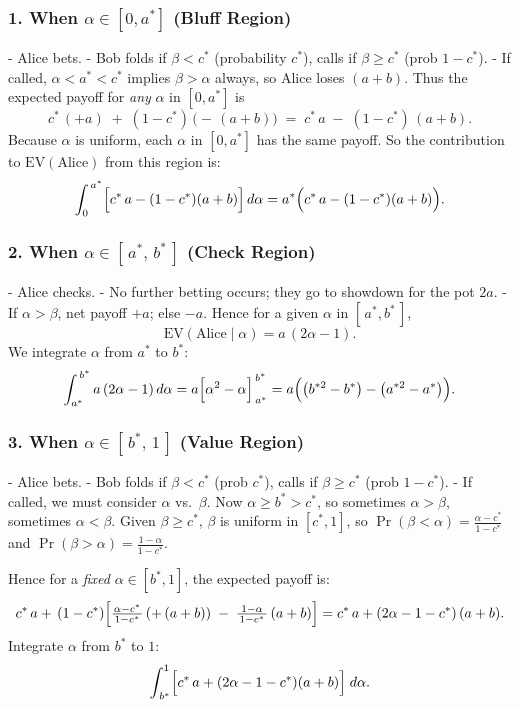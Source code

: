 \documentclass{article}
\begin{document}
\subsubsection*{1. When \texorpdfstring{$\alpha \in [0,a^*]$}{alpha in [0,a*]} (Bluff Region)}

- Alice bets.  
- Bob folds if $\beta < c^*$ (probability $c^*$), calls if $\beta \ge c^*$ (prob $1-c^*$).  
- If called, $\alpha < a^* < c^*$ implies $\beta > \alpha$ always, so Alice loses $(a+b)$.  
Thus the expected payoff for \emph{any} $\alpha$ in $[0,a^*]$ is
\[
c^*\,(+a)\;+\;(1-c^*)\,\bigl(-\,(a+b)\bigr)
\;=\;
c^*\,a \;-\;(1-c^*)\,(a+b).
\]
Because $\alpha$ is uniform, each $\alpha$ in $[0,a^*]$ has the same payoff.  So the contribution to $\mathrm{EV}(\text{Alice})$ from this region is:
\[
\int_0^{\,a^*} \Bigl[c^*\,a -(1-c^*)(a+b)\Bigr]\,d\alpha
= a^*\Bigl(c^*\,a -(1-c^*)(a+b)\Bigr).
\]

\subsubsection*{2. When \texorpdfstring{$\alpha \in [\,a^*,\,b^*\,]$}{alpha in [a*, b*]} (Check Region)}

- Alice checks.  
- No further betting occurs; they go to showdown for the pot $2a$.  
- If $\alpha > \beta$, net payoff $+a$; else $-a$.  
Hence for a given $\alpha$ in $[\,a^*,b^*\,]$, 
\[
\text{EV}(\text{Alice}\mid \alpha) = a\,(2\alpha -1).
\]
We integrate $\alpha$ from $a^*$ to $b^*$:
\[
\int_{a^*}^{\,b^*} a\,(2\alpha -1)\,d\alpha 
= a\Bigl[\alpha^2 - \alpha\Bigr]_{\,a^*}^{\,b^*}
= a\Bigl(\bigl(b^{*2}-b^*\bigr) - \bigl(a^{*2}-a^*\bigr)\Bigr).
\]

\subsubsection*{3. When \texorpdfstring{$\alpha \in [\,b^*,\,1\,]$}{alpha in [b*,1]} (Value Region)}

- Alice bets.  
- Bob folds if $\beta < c^*$ (prob $c^*$), calls if $\beta \ge c^*$ (prob $1-c^*$).  
- If called, we must consider $\alpha$ vs.\ $\beta$.  Now $\alpha \ge b^*>c^*$, so sometimes $\alpha>\beta$, sometimes $\alpha<\beta$.  
  Given $\beta\ge c^*$, $\beta$ is uniform in $[c^*,1]$, so $\Pr(\beta<\alpha)=\frac{\alpha-c^*}{1-c^*}$ and $\Pr(\beta>\alpha)=\frac{1-\alpha}{1-c^*}$.  

Hence for a \emph{fixed} $\alpha\in[b^*,1]$, the expected payoff is:
\[
c^*\,a 
+\,
(1-c^*)\Bigl[
\tfrac{\alpha-c^*}{\,1-c^*\,}\,(+\, (a+b))
\;-\;
\tfrac{1-\alpha}{\,1-c^*\,}\,(a+b)
\Bigr]
=
c^*\,a
+
(2\alpha -1 - c^*)\,(a+b).
\]
Integrate $\alpha$ from $b^*$ to $1$:
\[
\int_{\,b^*}^1 \Bigl[c^*\,a +(2\alpha -1 - c^*)(a+b)\Bigr]\;d\alpha.
\]
\end{document}

